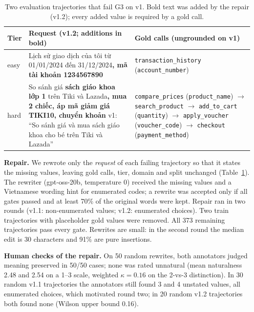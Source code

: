 \documentclass[conference,a4paper]{IEEEtran}
\begin{document}
\begin{table}[t]
\caption{Two evaluation trajectories that fail G3 on v1. Bold text was added
by the repair (v1.2); every added value is required by a gold call.}
\label{tab:examples}
\centering
\footnotesize
\setlength{\tabcolsep}{3pt}
\begin{tabular}{>{\raggedright\arraybackslash}p{} >{\raggedright\arraybackslash}p{} >{\raggedright\arraybackslash}p{}}
\toprule
Tier & Request (v1.2; additions in bold) & Gold calls (ungrounded on v1) \\
\midrule
easy & Lịch sử giao dịch của tôi từ 01/01/2024 đến 31/12/2024\textbf{, mã tài
khoản 1234567890} & \texttt{transaction\_history} (\texttt{account\_number}) \\
\addlinespace
hard & So sánh giá \textbf{sách giáo khoa lớp 1} trên Tiki và Lazada\textbf{,
mua 2 chiếc, áp mã giảm giá TIKI10, chuyển khoản}\newline
{\scriptsize v1: ``So sánh giá và mua sách giáo khoa cho bé trên Tiki và
Lazada''} & \texttt{compare\_prices} (\texttt{product\_name}) $\rightarrow$
\texttt{search\_product} $\rightarrow$ \texttt{add\_to\_cart}
(\texttt{quantity}) $\rightarrow$ \texttt{apply\_voucher}
(\texttt{voucher\_code}) $\rightarrow$ \texttt{checkout}
(\texttt{payment\_method}) \\
\bottomrule
\end{tabular}
\end{table}

\textbf{Repair.} We rewrote only the \emph{request} of each failing trajectory
so that it states the missing values, leaving gold calls, tier, domain and split
unchanged (Table~\ref{tab:examples}). The rewriter (gpt-oss-20b, temperature 0) received the missing values
and a Vietnamese wording hint for enumerated codes; a rewrite was accepted only
if all gates passed and at least 70\% of the original words were kept. Repair
ran in two rounds (v1.1: non-enumerated values; v1.2: enumerated choices). Two
train trajectories with placeholder gold values were removed. All 373 remaining
trajectories pass every gate. Rewrites are small: in the second round the
median edit is 30 characters and 91\% are pure insertions.

\textbf{Human checks of the repair.} On 50 random rewrites, both annotators
judged meaning preserved in 50/50 cases; none was rated unnatural (mean
naturalness 2.48 and 2.54 on a 1--3 scale, weighted $\kappa=0.16$ on the
2-vs-3 distinction). In 30 random v1.1 trajectories the annotators still found
3 and 4 unstated values, all enumerated choices, which motivated round two; in
20 random v1.2 trajectories both found none (Wilson upper bound 0.16).
\end{document}
